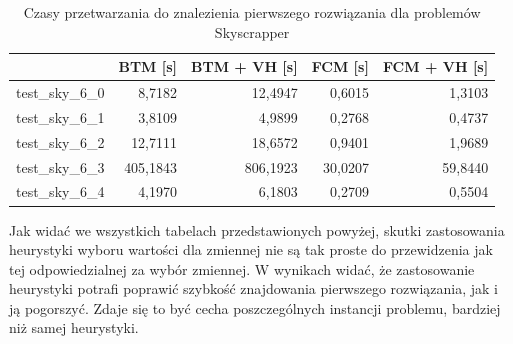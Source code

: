 \documentclass{article}
\begin{document}
\begin{table}[H]
	\caption{Czasy przetwarzania do znalezienia pierwszego rozwiązania dla problemów Skyscrapper}
	\label{tab:vh_sky_times}
	\begin{center}
		\begin{tabular}{|l|r|r|r|r|}
			\hline
			& \multicolumn{1}{c|}{\textbf{BTM [s]}} & \multicolumn{1}{c|}{\textbf{BTM + VH [s]}} & \multicolumn{1}{c|}{\textbf{FCM [s]}} & \multicolumn{1}{c|}{\textbf{FCM + VH [s]}} \\ \hline
			test\_sky\_6\_0 & 8,7182                           & 12,4947                             & 0,6015                       & 1,3103                             \\ \hline
			test\_sky\_6\_1 & 3,8109                        & 4,9899                              & 0,2768                       & 0,4737                             \\ \hline
			test\_sky\_6\_2 & 12,7111                        & 18,6572                              & 0,9401                        & 1,9689                             \\ \hline
			test\_sky\_6\_3 & 405,1843                        & 806,1923                               & 30,0207                        & 59,8440                              \\ \hline
			test\_sky\_6\_4 & 4,1970                        & 6,1803                              & 0,2709                       & 0,5504                            \\ \hline
		\end{tabular}
	\end{center}
\end{table}
Jak widać we wszystkich tabelach przedstawionych powyżej, skutki zastosowania heurystyki wyboru wartości dla zmiennej nie są tak proste do przewidzenia jak tej odpowiedzialnej za wybór zmiennej. W wynikach widać, że zastosowanie heurystyki potrafi poprawić szybkość znajdowania pierwszego rozwiązania, jak i ją pogorszyć. Zdaje się to być cecha poszczególnych instancji problemu, bardziej niż samej heurystyki.
\end{document}
